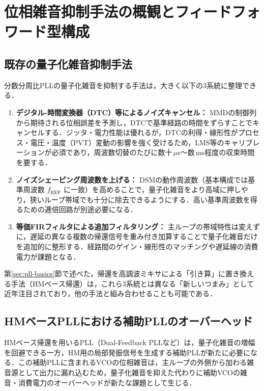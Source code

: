 \section{位相雑音抑制手法の概観とフィードフォワード型構成}
\label{sec:methods}

\subsection{既存の量子化雑音抑制手法}

分数分周比PLLの量子化雑音を抑制する手法は，大きく以下の3系統に整理できる．

\begin{enumerate}
  \item \textbf{デジタル-時間変換器（DTC）等によるノイズキャンセル：} MMDの制御列から期待される位相誤差を予測し，DTCで基準経路の時間をずらすことでキャンセルする．ジッタ・電力性能は優れるが，DTCの利得・線形性がプロセス・電圧・温度（PVT）変動の影響を強く受けるため，LMS等のキャリブレーションが必須であり，周波数切替のたびに数十\,$\mu$s〜数\,ms程度の収束時間を要する．
  \item \textbf{ノイズシェーピング周波数を上げる：} DSMの動作周波数（基本構成では基準周波数 $f_\text{REF}$ に一致）を高めることで，量子化雑音をより高域に押しやり，狭いループ帯域でも十分に除去できるようにする．高い基準周波数を得るための逓倍回路が別途必要になる．
  \item \textbf{等価FIRフィルタによる追加フィルタリング：} 主ループの帯域特性は変えずに，遅延の異なる複数の帰還信号を重み付き加算することで量子化雑音だけを追加的に整形する．経路間のゲイン・線形性のマッチングや遅延線の消費電力が課題となる．
\end{enumerate}

第\ref{sec:pll-basics}節で述べた，帰還を高調波ミキサによる「引き算」に置き換える手法（HMベース帰還）は，これら3系統とは異なる「新しいつまみ」として近年注目されており，他の手法と組み合わせることも可能である．

\subsection{HMベースPLLにおける補助PLLのオーバーヘッド}

HMベース帰還を用いるPLL（Dual-Feedback PLLなど）は，量子化雑音の増幅を回避できる一方，HM用の局部発振信号を生成する補助PLLが新たに必要になる．この補助PLLに含まれるVCOの位相雑音は，主ループの外側から加わる雑音源として出力に漏れ込むため，量子化雑音を抑えた代わりに補助VCOの雑音・消費電力のオーバーヘッドが新たな課題として生じる．

